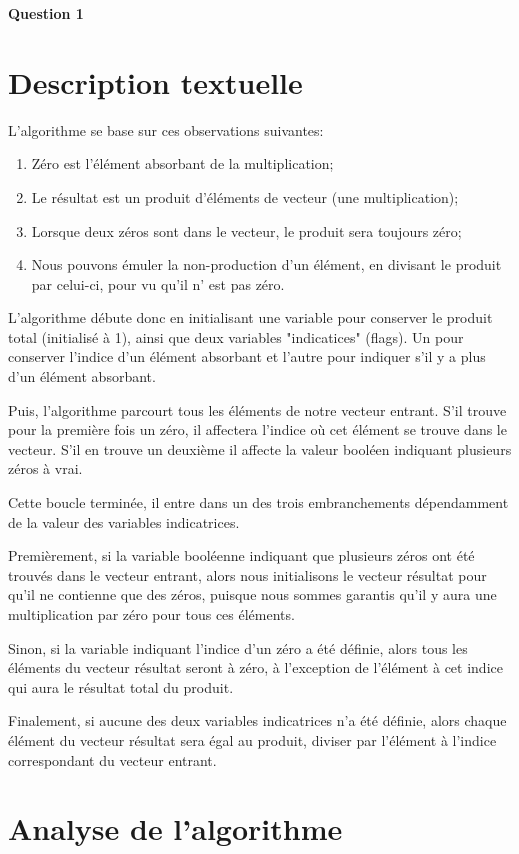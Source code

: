 \documentclass[class=article]{standalone}
\begin{document}
\centerline{\Huge \bf Question 1}
\bigskip
\section*{Description textuelle}

L'algorithme se base sur ces observations suivantes:
\begin{enumerate}
    \item Zéro est l'élément absorbant de la multiplication;
    \item Le résultat est un produit d'éléments de vecteur (une multiplication);
    \item Lorsque deux zéros sont dans le vecteur, le produit sera toujours zéro;
    \item Nous pouvons émuler la non-production d'un élément, en divisant le produit par celui-ci, pour vu qu'il n’ est pas zéro.
\end{enumerate}

L'algorithme débute donc en initialisant une variable pour conserver le produit total (initialisé à 1), 
ainsi que deux variables "indicatices" (flags). Un pour conserver l'indice d'un élément absorbant et l'autre pour indiquer s'il y a plus d'un élément absorbant.

Puis, l'algorithme parcourt tous les éléments de notre vecteur entrant. S'il trouve pour la première fois un zéro, il affectera l'indice
où cet élément se trouve dans le vecteur. S'il en trouve un deuxième il affecte la valeur booléen indiquant plusieurs zéros à vrai. 

Cette boucle terminée, il entre dans un des trois embranchements dépendamment de la valeur des variables indicatrices.

Premièrement, si la variable booléenne indiquant que plusieurs zéros ont été trouvés dans le vecteur entrant,
alors nous initialisons le vecteur résultat pour qu'il ne contienne que des zéros, puisque nous sommes garantis qu'il 
y aura une multiplication par zéro pour tous ces éléments. 

Sinon, si la variable indiquant l'indice d'un zéro a été définie, alors tous les éléments du vecteur résultat seront
à zéro, à l'exception de l'élément à cet indice qui aura le résultat total du produit.

Finalement, si aucune des deux variables indicatrices n'a été définie, alors chaque élément du vecteur résultat sera égal au produit, diviser par 
l'élément à l'indice correspondant du vecteur entrant.

\section*{Analyse de l'algorithme}
\end{document}
